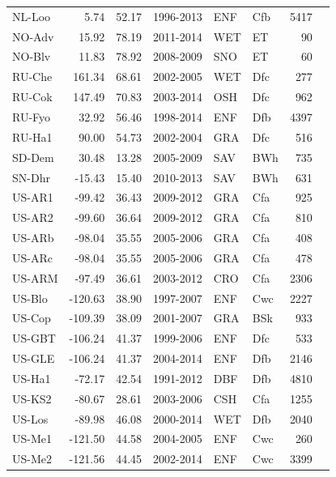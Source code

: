 \documentclass{myreport}
\begin{document}
\begin{longtable}{lrrlllrl}
 NL-Loo & 5.74 & 52.17 & 1996-2013 & ENF & Cfb & 5417 & \cite{NL-Loo} \\ 
 NO-Adv & 15.92 & 78.19 & 2011-2014 & WET & ET &  90 & \cite{NO-Adv} \\ 
 NO-Blv & 11.83 & 78.92 & 2008-2009 & SNO & ET &  60 & \cite{NO-Blv} \\ 
 RU-Che & 161.34 & 68.61 & 2002-2005 & WET & Dfc & 277 & \cite{RU-Che} \\ 
 RU-Cok & 147.49 & 70.83 & 2003-2014 & OSH & Dfc & 962 & \cite{RU-Cok} \\ 
 RU-Fyo & 32.92 & 56.46 & 1998-2014 & ENF & Dfb & 4397 & \cite{RU-Fyo} \\ 
 RU-Ha1 & 90.00 & 54.73 & 2002-2004 & GRA & Dfc & 516 & \cite{RU-Ha1} \\ 
 SD-Dem & 30.48 & 13.28 & 2005-2009 & SAV & BWh & 735 & \cite{SD-Dem} \\ 
 SN-Dhr & -15.43 & 15.40 & 2010-2013 & SAV & BWh & 631 & \cite{SN-Dhr} \\ 
 US-AR1 & -99.42 & 36.43 & 2009-2012 & GRA & Cfa & 925 & \cite{US-AR1} \\ 
 US-AR2 & -99.60 & 36.64 & 2009-2012 & GRA & Cfa & 810 & \cite{US-AR2} \\ 
 US-ARb & -98.04 & 35.55 & 2005-2006 & GRA & Cfa & 408 & \cite{US-ARb} \\ 
 US-ARc & -98.04 & 35.55 & 2005-2006 & GRA & Cfa & 478 & \cite{US-ARc} \\ 
 US-ARM & -97.49 & 36.61 & 2003-2012 & CRO & Cfa & 2306 & \cite{US-ARM} \\ 
 US-Blo & -120.63 & 38.90 & 1997-2007 & ENF & Cwc & 2227 & \cite{US-Blo} \\ 
 US-Cop & -109.39 & 38.09 & 2001-2007 & GRA & BSk & 933 & \cite{US-Cop} \\ 
 US-GBT & -106.24 & 41.37 & 1999-2006 & ENF & Dfc & 533 & \cite{US-GBT} \\ 
 US-GLE & -106.24 & 41.37 & 2004-2014 & ENF & Dfb & 2146 & \cite{US-GLE} \\ 
 US-Ha1 & -72.17 & 42.54 & 1991-2012 & DBF & Dfb & 4810 & \cite{US-Ha1} \\ 
 US-KS2 & -80.67 & 28.61 & 2003-2006 & CSH & Cfa & 1255 & \cite{US-KS2} \\ 
 US-Los & -89.98 & 46.08 & 2000-2014 & WET & Dfb & 2040 & \cite{US-Los} \\ 
 US-Me1 & -121.50 & 44.58 & 2004-2005 & ENF & Cwc & 260 & \cite{US-Me1} \\ 
 US-Me2 & -121.56 & 44.45 & 2002-2014 & ENF & Cwc & 3399 & \cite{US-Me2} \\ 

\end{longtable}
\end{document}
